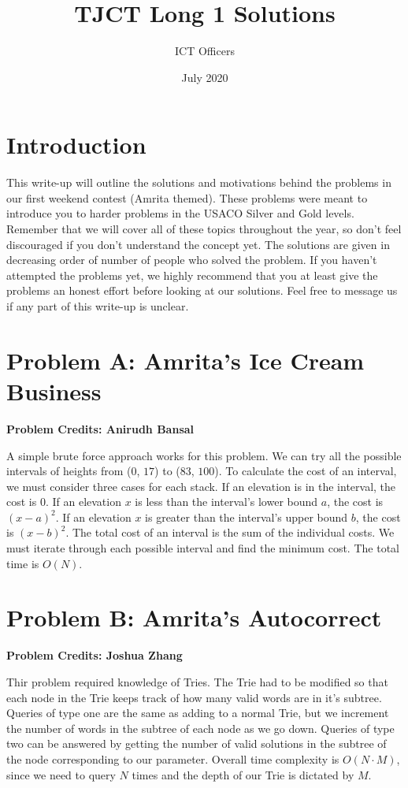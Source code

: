 \documentclass{article}
\title{TJCT Long 1 Solutions}
\author{ICT Officers}
\date{July 2020}
\begin{document}
\maketitle

\section{Introduction}
This write-up will outline the solutions and motivations behind the problems in our first weekend contest (Amrita themed). These problems were meant to introduce you to harder problems in the USACO Silver and Gold levels. Remember that we will cover all of these topics throughout the year, so don't feel discouraged if you don't understand the concept yet. The solutions are given in decreasing order of number of people who solved the problem. If you haven't attempted the problems yet, we highly recommend that you at least give the problems an honest effort before looking at our solutions. Feel free to message us if any part of this write-up is unclear.

\section{Problem A: Amrita's Ice Cream Business}
\textbf{Problem Credits: Anirudh Bansal}

A simple brute force approach works for this problem. We can try all the possible intervals of heights from ($0$, $17$) to ($83$, $100$). To calculate the cost of an interval, we must consider three cases for each stack. If an elevation is in the interval, the cost is $0$. If an elevation $x$ is less than the interval's lower bound $a$, the cost is $(x-a)^2$. If an elevation $x$ is greater than the interval's upper bound $b$, the cost is $(x-b)^2$. The total cost of an interval is the sum of the individual costs. We must iterate through each possible interval and find the minimum cost. The total time is $O(N)$.


\section{Problem B: Amrita's Autocorrect}
\textbf{Problem Credits: Joshua Zhang}

Thir problem required knowledge of Tries. The Trie had to be modified so that each node in the Trie keeps track of how many valid words are in it's subtree. Queries of type one are the same as adding to a normal Trie, but we increment the number of words in the subtree of each node as we go down. Queries of type two can be answered by getting the number of valid solutions in the subtree of the node corresponding to our parameter. Overall time complexity is $O(N \cdot M)$, since we need to query $N$ times and the depth of our Trie is dictated by $M$.
\end{document}
